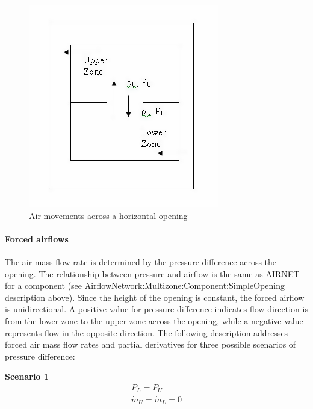 \begin{figure}[hbtp] %
\centering
\includegraphics[width=0.9\linewidth, height=0.9\textheight, keepaspectratio=true]{media/image2716.png}
\caption{Air movements across a horizontal opening \protect \label{fig:air-movements-across-a-horizontal-opening}}
\end{figure}

\paragraph{Forced airflows}\label{forced-airflows}

The air mass flow rate is determined by the pressure difference across the opening. The relationship between pressure and airflow is the same as AIRNET for a component (see AirflowNetwork:Multizone:Component:SimpleOpening description above). Since the height of the opening is constant, the forced airflow is unidirectional. A positive value for pressure difference indicates flow direction is from the lower zone to the upper zone across the opening, while a negative value represents flow in the opposite direction. The following description addresses forced air mass flow rates and partial derivatives for three possible scenarios of pressure difference:

\textbf{Scenario 1}
\begin{gather}
P_L = P_U \\
\dot{m}_U = \dot{m}_L = 0
\end{gather}

